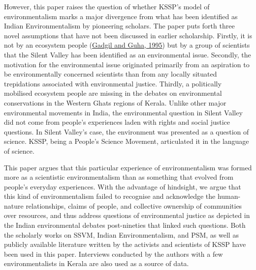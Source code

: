 \documentclass[twoside, 13pt]{article}
\begin{document}
{\fontsize{12}{14}\selectfont However, this paper raises the question of whether KSSP’s model of environmentalism marks a major divergence from what has been identified as Indian Environmentalism by pioneering scholars. The paper puts forth three novel assumptions that have not been discussed in earlier scholarship. Firstly, it is not by an ecosystem people (\underline{Gadgil and Guha, 1995}) but by a group of scientists that the Silent Valley has been identified as an environmental issue. Secondly, the motivation for the environmental issue originated primarily from an aspiration to be environmentally concerned scientists than from any locally situated trepidations associated with environmental justice. Thirdly, a politically mobilised ecosystem people are missing in the debates on environmental conservations in the Western Ghats regions of Kerala. Unlike other major environmental movements in India, the environmental question in Silent Valley did not come from people’s experiences laden with rights and social justice questions. In Silent Valley’s case, the environment was presented as a question of science. KSSP, being a People’s Science Movement, articulated it in the language of science.}


{\fontsize{12}{14}\selectfont This paper argues that this particular experience of environmentalism was formed more as a scientistic environmentalism than as something that evolved from people’s everyday experiences. With the advantage of hindsight, we argue that this kind of environmentalism failed to recognise and acknowledge the human-nature relationships, claims of people, and collective ownership of communities over resources, and thus address questions of environmental justice as depicted in the Indian environmental debates post-nineties that linked such questions. Both the scholarly works on SSVM, Indian Environmentalism, and PSM, as well as publicly available literature written by the activists and scientists of KSSP have been used in this paper. Interviews conducted by the authors with a few environmentalists in Kerala are also used as a source of data.}
\end{document}
